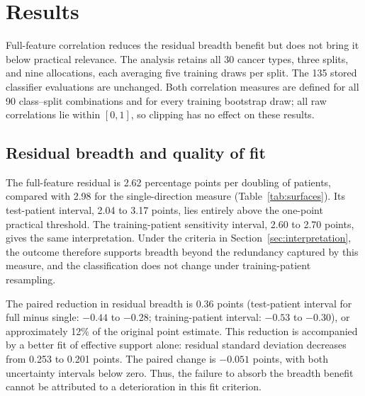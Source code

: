 \section{Results}
\label{sec:results}
Full-feature correlation reduces the residual breadth benefit but does not bring it below practical relevance. The analysis retains all 30 cancer types, three splits, and nine allocations, each averaging five training draws per split. The 135 stored classifier evaluations are unchanged. Both correlation measures are defined for all 90 class--split combinations and for every training bootstrap draw; all raw correlations lie within $[0,1]$, so clipping has no effect on these results.

\subsection{Residual breadth and quality of fit}
The full-feature residual is 2.62 percentage points per doubling of patients, compared with 2.98 for the single-direction measure (Table~\ref{tab:surfaces}). Its test-patient interval, 2.04 to 3.17 points, lies entirely above the one-point practical threshold. The training-patient sensitivity interval, 2.60 to 2.70 points, gives the same interpretation. Under the criteria in Section~\ref{sec:interpretation}, the outcome therefore supports breadth beyond the redundancy captured by this measure, and the classification does not change under training-patient resampling.

\begin{table}[htbp]
\centering
\small

\caption{Full-feature correlation reduces both the residual breadth benefit and the error of the effective-support-only fit. Residual breadth is in percentage points per doubling of patients; fit error is the residual standard deviation in percentage points across nine cells, with seven residual degrees of freedom. Test-patient and training-patient 95\% intervals describe separate sources of uncertainty. Differences use paired draws, not differences between interval endpoints.}
\label{tab:surfaces}
\end{table}

\noindent The paired reduction in residual breadth is 0.36 points (test-patient interval for full minus single: $-0.44$ to $-0.28$; training-patient interval: $-0.53$ to $-0.30$), or approximately 12\% of the original point estimate. This reduction is accompanied by a better fit of effective support alone: residual standard deviation decreases from 0.253 to 0.201 points. The paired change is $-0.051$ points, with both uncertainty intervals below zero. Thus, the failure to absorb the breadth benefit cannot be attributed to a deterioration in this fit criterion.

